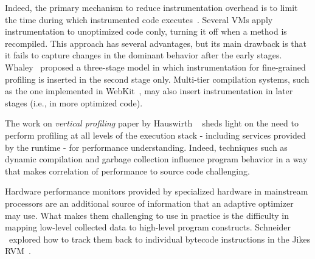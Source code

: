 Indeed, the primary mechanism to reduce instrumentation overhead is to limit the time during which instrumented code executes~\cite{Arnold05}. Several VMs apply instrumentation to unoptimized code conly, turning it off when a method is recompiled. This approach has several advantages, but its main drawback is that it fails to capture changes in the dominant behavior after the early stages. Whaley~\cite{Whaley01} proposed a three-stage model in which instrumentation for fine-grained profiling is inserted in the second stage only. Multi-tier compilation systems, such as the one implemented in WebKit~\cite{Pizlo14}, may also insert instrumentation in later stages (i.e., in more optimized code).

The work on {\em vertical profiling} paper by Hauswirth \etal~\cite{Hauswirth04} sheds light on the need to perform profiling at all levels of the execution stack - including services provided by the runtime - for performance understanding. Indeed, techniques such as dynamic compilation and garbage collection influence program behavior in a way that makes correlation of performance to source code challenging.

Hardware performance monitors provided by specialized hardware in mainstream processors are an additional source of information that an adaptive optimizer may use. What makes them challenging to use in practice is the difficulty in mapping low-level collected data to high-level program constructs. Schneider \etal\ explored how to track them back to individual bytecode instructions in the Jikes RVM~\cite{Schneider07}.

